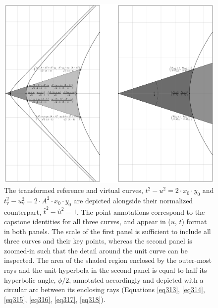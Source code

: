 \documentclass{article}
\begin{document}
\begin{figure}[ht]
    \centering
    \includegraphics[width=\textwidth]{fig54.png}
    \captionsetup{
        justification=raggedright,
        singlelinecheck=false,
        font=small,
        labelfont=bf,
        labelsep=quad,
        format=plain
    }
    \caption{The transformed reference and virtual curves, $t^{2} - u^{2} = 2 \cdot x_{0} \cdot y_{0}$ and $t_{\text{v}}^{2} - u_{\text{v}}^{2} = 2 \cdot A^{2} \cdot x_{0} \cdot y_{0}$ are depicted alongside their normalized counterpart, ${\hat{t}}^{2} - {\hat{u}}^{2} = 1$. The point annotations correspond to the capstone identities for all three curves, and appear in ($u$, $t$) format in both panels. The scale of the first panel is sufficient to include all three curves and their key points, whereas the second panel is zoomed-in such that the detail around the unit curve can be inspected. The area of the shaded region enclosed by the outer-most rays and the unit hyperbola in the second panel is equal to half its hyperbolic angle, $\phi / 2$, annotated accordingly and depicted with a circular arc between its enclosing rays (Equations \ref{eq313}, \ref{eq314}, \ref{eq315}, \ref{eq316}, \ref{eq317}, \ref{eq318}).}
    \label{fig54}
\end{figure}
\end{document}
